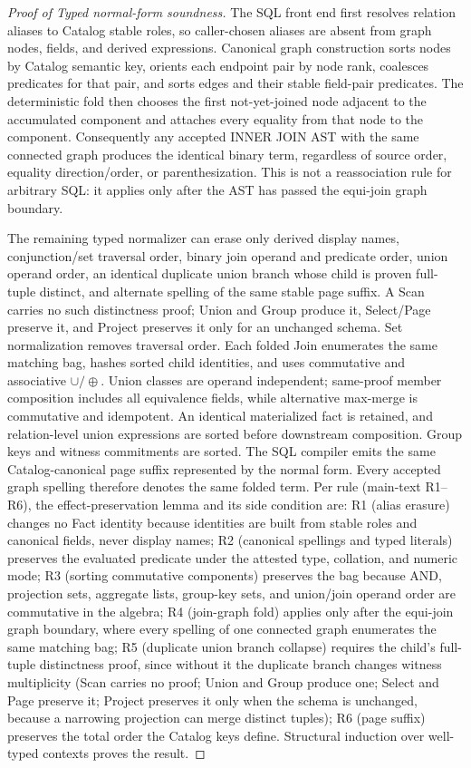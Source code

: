 \documentclass[journal,onecolumn]{IEEEtran}
\begin{document}
\begin{proof}[Proof of Typed normal-form soundness]
The SQL front end first resolves relation aliases to Catalog stable roles, so
caller-chosen aliases are absent from graph nodes, fields, and derived
expressions.  Canonical graph construction sorts nodes by Catalog semantic key,
orients each endpoint pair by node rank, coalesces predicates for that pair,
and sorts edges and their stable field-pair predicates.  The deterministic fold
then chooses the first not-yet-joined node adjacent to the accumulated component
and attaches every equality from that node to the component.  Consequently any
accepted INNER JOIN AST with the same connected graph produces the identical
binary term, regardless of source order, equality direction/order, or
parenthesization.  This is not a reassociation rule for arbitrary SQL: it
applies only after the AST has passed the equi-join graph boundary.

The remaining typed normalizer can erase only derived display names,
conjunction/set traversal order, binary join operand and predicate order, union
operand order, an identical duplicate union branch whose child is proven
full-tuple distinct, and alternate spelling of the same stable page suffix. A
Scan carries no such distinctness proof; Union and Group produce it,
Select/Page preserve it, and Project preserves it only for an unchanged schema.
Set normalization removes traversal order. Each folded Join enumerates the same
matching bag, hashes sorted child identities, and uses commutative and
associative $\cup/\oplus$. Union classes are operand independent; same-proof
member composition includes all equivalence fields, while alternative
max-merge is commutative and idempotent. An identical materialized fact is
retained, and relation-level union expressions are sorted before downstream
composition. Group keys and witness commitments are sorted. The SQL compiler
emits the same Catalog-canonical page suffix represented by the normal form.
Every accepted graph spelling therefore denotes the same folded term. Per
rule (main-text R1--R6), the effect-preservation lemma and its side
condition are: R1 (alias erasure) changes no Fact identity because
identities are built from stable roles and canonical fields, never display
names; R2 (canonical spellings and typed literals) preserves the evaluated
predicate under the attested type, collation, and numeric mode; R3 (sorting
commutative components) preserves the bag because AND, projection sets,
aggregate lists, group-key sets, and union/join operand order are
commutative in the algebra; R4 (join-graph fold) applies only after the
equi-join graph boundary, where every spelling of one connected graph
enumerates the same matching bag; R5 (duplicate union branch collapse)
requires the child's full-tuple distinctness proof, since without it the
duplicate branch changes witness multiplicity (Scan carries no proof; Union
and Group produce one; Select and Page preserve it; Project preserves it
only when the schema is unchanged, because a narrowing projection can merge
distinct tuples); R6 (page suffix) preserves the total order the Catalog
keys define. Structural induction over well-typed contexts proves the
result.
\end{proof}
\end{document}
